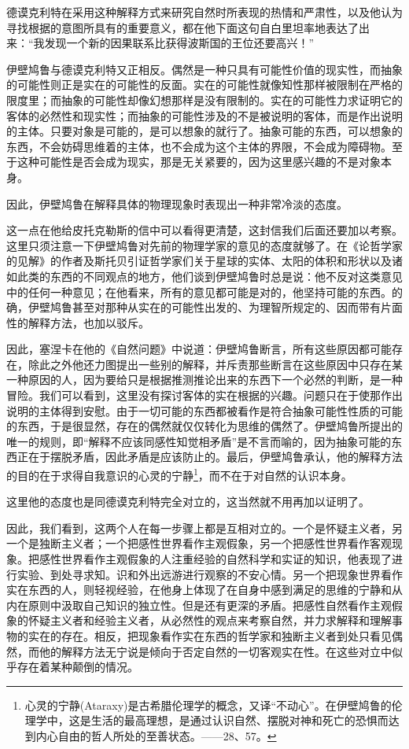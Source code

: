 \documentclass[a4paper,twoside,12pt,AutoFakeBold]{ctexart}
\begin{document}
德谟克利特在采用这种解释方式来研究自然时所表现的热情和严肃性，以及他认为寻找根据的意图所具有的重要意义，都在他下面这句自白里坦率地表达了出来：“我发现一个新的因果联系比获得波斯国的王位还要高兴！”

伊壁鸠鲁与德谟克利特又正相反。偶然是一种只具有可能性价值的现实性，而抽象的可能性则正是实在的可能性的反面。实在的可能性就像知性那样被限制在严格的限度里；而抽象的可能性却像幻想那样是没有限制的。实在的可能性力求证明它的客体的必然性和现实性；而抽象的可能性涉及的不是被说明的客体，而是作出说明的主体。只要对象是可能的，是可以想象的就行了。抽象可能的东西，可以想象的东西，不会妨碍思维着的主体，也不会成为这个主体的界限，不会成为障碍物。至于这种可能性是否会成为现实，那是无关紧要的，因为这里感兴趣的不是对象本身。

因此，伊壁鸠鲁在解释具体的物理现象时表现出一种非常冷淡的态度。

这一点在他给皮托克勒斯的信中可以看得更清楚，这封信我们后面还要加以考察。这里只须注意一下伊壁鸠鲁对先前的物理学家的意见的态度就够了。在《论哲学家的见解》的作者及斯托贝引证哲学家们关于星球的实体、太阳的体积和形状以及诸如此类的东西的不同观点的地方，他们谈到伊壁鸠鲁时总是说：他不反对这类意见中的任何一种意见；在他看来，所有的意见都可能是对的，他坚持可能的东西。的确，伊壁鸠鲁甚至对那种从实在的可能性出发的、为理智所规定的、因而带有片面性的解释方法，也加以驳斥。

因此，塞涅卡在他的《自然问题》中说道：伊壁鸠鲁断言，所有这些原因都可能存在，除此之外他还力图提出一些别的解释，并斥责那些断言在这些原因中只存在某一种原因的人，因为要给只是根据推测推论出来的东西下一个必然的判断，是一种冒险。我们可以看到，这里没有探讨客体的实在根据的兴趣。问题只在于使那作出说明的主体得到安慰。由于一切可能的东西都被看作是符合抽象可能性性质的可能的东西，于是很显然，存在的偶然就仅仅转化为思维的偶然了。伊壁鸠鲁所提出的唯一的规则，即“解释不应该同感性知觉相矛盾”是不言而喻的，因为抽象可能的东西正在于摆脱矛盾，因此矛盾是应该防止的。最后，伊壁鸠鲁承认，他的解释方法的目的在于求得自我意识的心灵的宁静\footnote{心灵的宁静(Ataraxy)是古希腊伦理学的概念，又译“不动心”。在伊壁鸠鲁的伦理学中，这是生活的最高理想，是通过认识自然、摆脱对神和死亡的恐惧而达到内心自由的哲人所处的至善状态。——28、57。}，而不在于对自然的认识本身。

这里他的态度也是同德谟克利特完全对立的，这当然就不用再加以证明了。

因此，我们看到，这两个人在每一步骤上都是互相对立的。一个是怀疑主义者，另一个是独断主义者；一个把感性世界看作主观假象，另一个把感性世界看作客观现象。把感性世界看作主观假象的人注重经验的自然科学和实证的知识，他表现了进行实验、到处寻求知。识和外出远游进行观察的不安心情。另一个把现象世界看作实在东西的人，则轻视经验，在他身上体现了在自身中感到满足的思维的宁静和从内在原则中汲取自己知识的独立性。但是还有更深的矛盾。把感性自然看作主观假象的怀疑主义者和经验主义者，从必然性的观点来考察自然，并力求解释和理解事物的实在的存在。相反，把现象看作实在东西的哲学家和独断主义者到处只看见偶然，而他的解释方法无宁说是倾向于否定自然的一切客观实在性。在这些对立中似乎存在着某种颠倒的情况。
\end{document}
